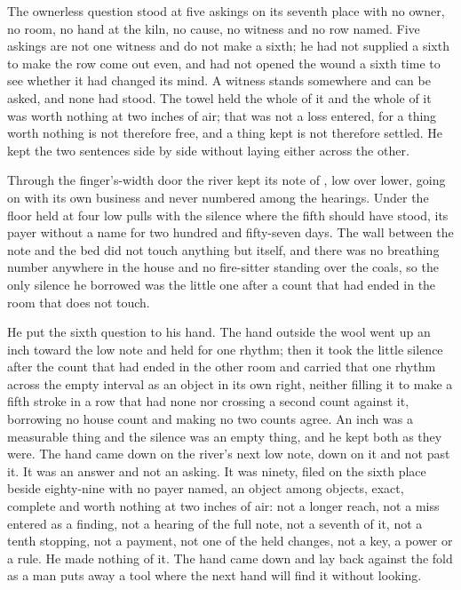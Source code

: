 The ownerless question stood at five askings on its seventh place with no owner, no room, no hand at the kiln, no cause, no witness and no row named. Five askings are not one witness and do not make a sixth; he had not supplied a sixth to make the row come out even, and had not opened the wound a sixth time to see whether it had changed its mind. A witness stands somewhere and can be asked, and none had stood. The towel held the whole of it and the whole of it was worth nothing at two inches of air; that was not a loss entered, for a thing worth nothing is not therefore free, and a thing kept is not therefore settled. He kept the two sentences side by side without laying either across the other.

\scenebreak

Through the finger's-width door the river kept its note of , low over lower, going on with its own business and never numbered among the hearings. Under the floor  held at four low pulls with the silence where the fifth should have stood, its payer without a name for two hundred and fifty-seven days. The wall between the note and the bed did not touch anything but itself, and there was no breathing number anywhere in the house and no fire-sitter standing over the coals, so the only silence he borrowed was the little one after a count that had ended in the room that does not touch.

He put the sixth question to his hand. The hand outside the wool went up an inch toward the low note and held for one rhythm; then it took the little silence after the count that had ended in the other room and carried that one rhythm across the empty interval as an object in its own right, neither filling it to make a fifth stroke in a row that had none nor crossing a second count against it, borrowing no house count and making no two counts agree. An inch was a measurable thing and the silence was an empty thing, and he kept both as they were. The hand came down on the river's next low note, down on it and not past it. It was an answer and not an asking. It was ninety, filed on the sixth place beside eighty-nine with no payer named, an object among objects, exact, complete and worth nothing at two inches of air: not a longer reach, not a miss entered as a finding, not a hearing of the full note, not a seventh of it, not a tenth stopping, not a payment, not one of the held changes, not a key, a power or a rule. He made nothing of it. The hand came down and lay back against the fold as a man puts away a tool where the next hand will find it without looking.

